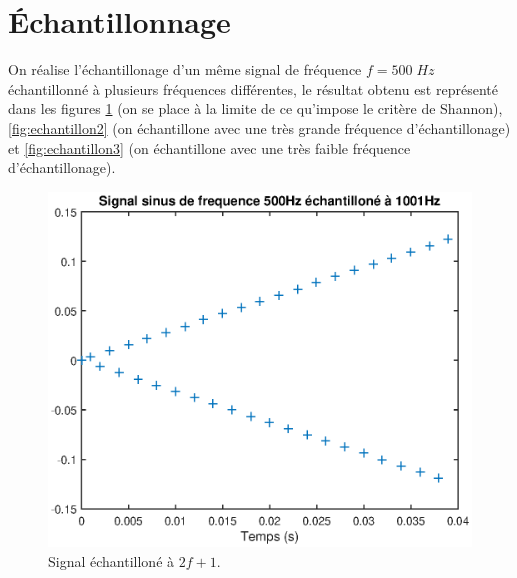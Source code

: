 \documentclass[french]{article}
\begin{document}
\section{Échantillonnage}
On réalise l'échantillonage d'un même signal de fréquence $f=500 \; Hz$ échantillonné à plusieurs fréquences différentes, le résultat obtenu est représenté dans les figures \ref{fig:echantillon1} (on se place à la limite de ce qu'impose le critère de Shannon), \ref{fig:echantillon2} (on échantillone avec une très grande fréquence d'échantillonage) et \ref{fig:echantillon3} (on échantillone avec une très faible fréquence d'échantillonage).

\begin{figure}[h!]
	\centering
	\begin{minipage}{0.45\textwidth}
	\centering
	\includegraphics[width=\textwidth]{images/echantillone_1.eps}
	\caption{Signal échantilloné à $2f+1$.}
	\label{fig:echantillon1}


\end{minipage}
\end{figure}
\end{document}
